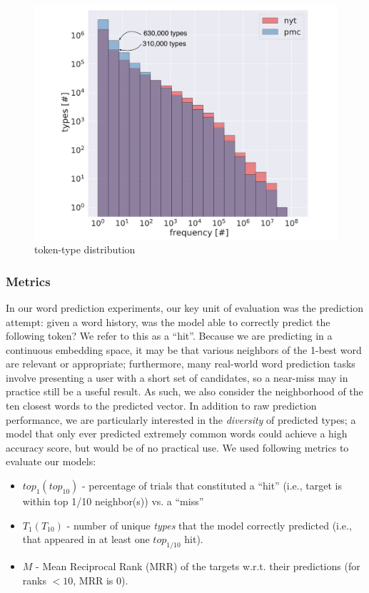 \documentclass[11pt,a4paper]{article}
\begin{document}
\begin{figure}[h]
    \centering
    \includegraphics[width=0.4
    \textwidth]{fig/nyt_pmc_token_freq.pdf}
    \caption{token-type distribution}
    \vspace{-0.25in}
    \label{fig:nyt_pmc_distribution}
\end{figure}

\subsubsection{Metrics}

In our word prediction experiments, our key unit of evaluation was the prediction attempt: given a word history, was the model able to correctly predict the following token? 
We refer to this as a ``hit''. 
Because we are predicting in a continuous embedding space, it may be that various neighbors of the 1-best word are relevant or appropriate; furthermore, many real-world word prediction tasks involve presenting a user with a short set of candidates, so a near-miss may in practice still be a useful result.
As such, we also consider the neighborhood of the ten closest words to the predicted vector.
In addition to raw prediction performance, we are particularly interested in the \textit{diversity} of predicted types; a model that only ever predicted extremely common words could achieve a high accuracy score, but would be of no practical use. 
We used following metrics to evaluate our models: 

\begin{itemize}
 \setlength\itemsep{0.1em}
  \item $top_{1}(top_{10})$ - percentage of trials that constituted a  ``hit'' (i.e., target is within top 1/10 neighbor(s)) vs. a ``miss''
  \item $T_{1}(T_{10})$ - number of unique \textit{types} that the model correctly predicted (i.e., that appeared in at least one $top_{1/10}$ hit). 
  \item $M$ - Mean Reciprocal Rank (MRR) of the targets w.r.t. their predictions (for ranks $<10$, MRR is 0).
\end{itemize} 
\end{document}
